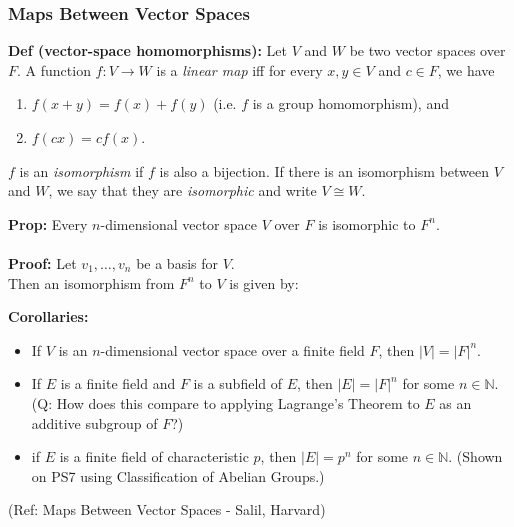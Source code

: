 \begin{frame}[fragile]
\frametitle{Maps Between Vector Spaces}

 \textbf{Def (vector-space homomorphisms):}  Let $V$ and $W$ be two vector spaces over $F$.  A function $f : V\rightarrow W$ is a {\em linear map} iff
for every $x,y\in V$ and $c\in F$, we have
\begin{enumerate}
\item $f(x+y)=f(x)+f(y)$ (i.e. $f$ is a group homomorphism), and
\item $f(cx)=cf(x)$.
  \end{enumerate}
$f$ is an {\em isomorphism} if $f$ is also a bijection.  If there is an isomorphism between $V$ and $W$, we say that they are {\em isomorphic} and write $V\cong W$.

 \textbf{Prop:} Every $n$-dimensional vector space $V$ over $F$ is isomorphic to $F^n$.\\
\ \\
\textbf{Proof:} Let $v_1,\ldots,v_n$ be a basis for $V$.\\  Then an isomorphism from $F^n$ to $V$ is given by:


 \textbf{Corollaries:}
\begin{itemize}
\item If $V$ is an $n$-dimensional vector space over a finite field $F$, then $|V|=|F|^n$.
\item If $E$ is a finite field and $F$ is a subfield of $E$, then $|E|=|F|^n$ for some $n\in {\mathbb N}$.  (Q: How does this compare to applying Lagrange's Theorem to $E$ as an additive subgroup of $F$?)
\item if $E$ is a finite field of characteristic $p$, then $|E|=p^n$ for some $n\in {\mathbb N}$. (Shown on PS7 using Classification of Abelian Groups.)
\end{itemize}

\tiny{(Ref: Maps Between Vector Spaces - Salil, Harvard)}
\end{frame}



